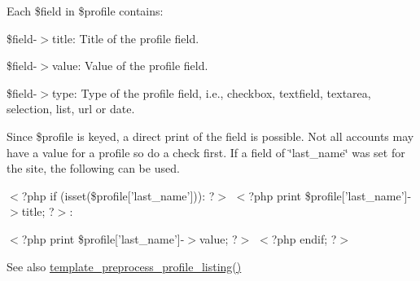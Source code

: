 Each \$field in \$profile contains:
\begin{DoxyItemize}
\item \$field-\/$>$title: Title of the profile field.
\item \$field-\/$>$value: Value of the profile field.
\item \$field-\/$>$type: Type of the profile field, i.e., checkbox, textfield, textarea, selection, list, url or date.
\end{DoxyItemize}

Since \$profile is keyed, a direct print of the field is possible. Not all accounts may have a value for a profile so do a check first. If a field of \char`\"{}last\_\-name\char`\"{} was set for the site, the following can be used.

$<$?php if (isset(\$profile\mbox{[}'last\_\-name'\mbox{]})): ?$>$  $<$?php print \$profile\mbox{[}'last\_\-name'\mbox{]}-\/$>$title; ?$>$:\par
 $<$?php print \$profile\mbox{[}'last\_\-name'\mbox{]}-\/$>$value; ?$>$  $<$?php endif; ?$>$

\begin{DoxySeeAlso}{See also}
\hyperlink{profile_8module_a7dc89cd06dce412d737449102c65c5d5}{template\_\-preprocess\_\-profile\_\-listing()} 
\end{DoxySeeAlso}
